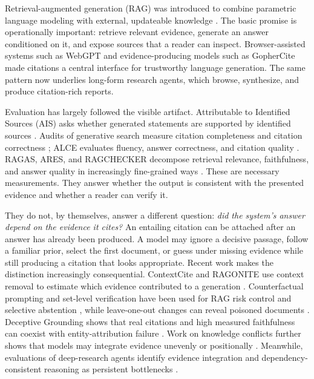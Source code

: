 \documentclass[10pt,twocolumn]{article}
\begin{document}
Retrieval-augmented generation (RAG) was introduced to combine parametric language modeling with external, updateable knowledge \citep{lewis2020rag}. The basic promise is operationally important: retrieve relevant evidence, generate an answer conditioned on it, and expose sources that a reader can inspect. Browser-assisted systems such as WebGPT \citep{nakano2021webgpt} and evidence-producing models such as GopherCite \citep{menick2022verified} made citations a central interface for trustworthy language generation. The same pattern now underlies long-form research agents, which browse, synthesize, and produce citation-rich reports.

Evaluation has largely followed the visible artifact. Attributable to Identified Sources (AIS) asks whether generated statements are supported by identified sources \citep{rashkin2021ais}. Audits of generative search measure citation completeness and citation correctness \citep{liu2023verifiability}; ALCE evaluates fluency, answer correctness, and citation quality \citep{gao2023alce}. RAGAS, ARES, and RAGCHECKER decompose retrieval relevance, faithfulness, and answer quality in increasingly fine-grained ways \citep{es2023ragas,saadfalcon2023ares,ru2024ragchecker}. These are necessary measurements. They answer whether the output is consistent with the presented evidence and whether a reader can verify it.

They do not, by themselves, answer a different question: \emph{did the system's answer depend on the evidence it cites?} An entailing citation can be attached after an answer has already been produced. A model may ignore a decisive passage, follow a familiar prior, select the first document, or guess under missing evidence while still producing a citation that looks appropriate. Recent work makes the distinction increasingly consequential. ContextCite and RAGONITE use context removal to estimate which evidence contributed to a generation \citep{cohenwang2024contextcite,saharoy2024ragonite}. Counterfactual prompting and set-level verification have been used for RAG risk control and selective abstention \citep{chen2024risk,qiu2026surerag}, while leave-one-out changes can reveal poisoned documents \citep{kumar2026raguard}. Deceptive Grounding shows that real citations and high measured faithfulness can coexist with entity-attribution failure \citep{caruzzo2026deceptive}. Work on knowledge conflicts further shows that models may integrate evidence unevenly or positionally \citep{xu2024knowledge,yang2026contextconflict}. Meanwhile, evaluations of deep-research agents identify evidence integration and dependency-consistent reasoning as persistent bottlenecks \citep{zhang2025finder,guo2026mrlhdr}.
\end{document}
